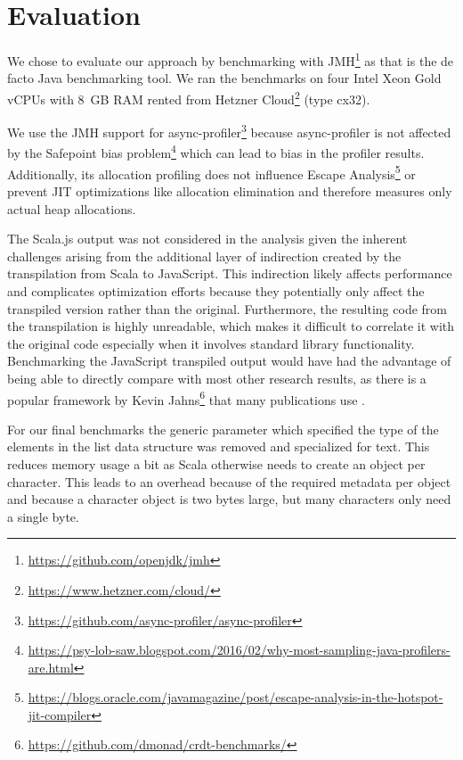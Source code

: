 
\chapter{Evaluation} \label{chapter:evaluation}

We chose to evaluate our approach by benchmarking with JMH\footnote{\url{https://github.com/openjdk/jmh}} as that is the de facto Java benchmarking tool. We ran the benchmarks on four Intel Xeon Gold vCPUs with 8~GB RAM rented from Hetzner Cloud\footnote{\url{https://www.hetzner.com/cloud/}} (type cx32).

We use the JMH support for async-profiler\footnote{\label{footnote:async-profiler}\url{https://github.com/async-profiler/async-profiler}} because async-profiler is not affected by the Safepoint bias problem\footnote{\url{https://psy-lob-saw.blogspot.com/2016/02/why-most-sampling-java-profilers-are.html}} which can lead to bias in the profiler results. Additionally, its allocation profiling does not influence Escape Analysis\footnote{\url{https://blogs.oracle.com/javamagazine/post/escape-analysis-in-the-hotspot-jit-compiler}} or prevent JIT optimizations like allocation elimination and therefore measures only actual heap allocations.

The Scala.js output was not considered in the analysis given the inherent challenges arising from the additional layer of indirection created by the transpilation from Scala to JavaScript. This indirection likely affects performance and complicates optimization efforts because they potentially only affect the transpiled version rather than the original. Furthermore, the resulting code from the transpilation is highly unreadable, which makes it difficult to correlate it with the original code especially when it involves standard library functionality. Benchmarking the JavaScript transpiled output would have had the advantage of being able to directly compare with most other research results, as there is a popular framework by Kevin Jahns\footnote{\url{https://github.com/dmonad/crdt-benchmarks/}} that many publications use \cite[Section~5.1]{2023-weidner-minimizing-interleaving}.

For our final benchmarks the generic parameter which specified the type of the elements in the list data structure was removed and specialized for text. This reduces memory usage a bit as Scala otherwise needs to create an object per character. This leads to an
overhead because of the required metadata per object and because a character object is two bytes large, but many
characters only need a single byte.

